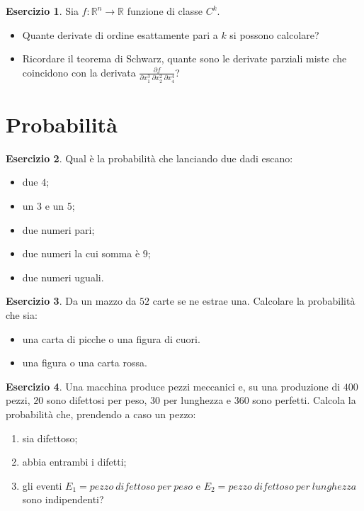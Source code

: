 \documentclass[12pt,a4paper]{article}
\theoremstyle{definition}
\newtheorem{exe}{Esercizio}
\begin{document}
\begin{exe}
	Sia $ f: \mathbb{R}^n \to \mathbb{R} $ funzione di classe $ C^k $.
	\begin{itemize}
		\item Quante derivate di ordine esattamente pari a $ k $ si possono calcolare?
		\item Ricordare il teorema di Schwarz, quante sono le derivate parziali miste che coincidono con la derivata $ \frac{\partial f}{\partial x_1^3\ \partial x_2^2\ \partial x_4^4} $?
	\end{itemize}
\end{exe}

\section{Probabilità}

\begin{exe}
	Qual è la probabilità che lanciando due dadi escano:
	\begin{itemize}
		\item due $ 4 $;
		\item un $ 3 $ e un $ 5 $;
		\item due numeri pari;
		\item due numeri la cui somma è $ 9 $;
		\item due numeri uguali.
	\end{itemize}
\end{exe}

\begin{exe}
	Da un mazzo da $ 52 $ carte se ne estrae una. Calcolare la probabilità che sia:
	\begin{itemize}
		\item una carta di picche o una figura di cuori.
		\item una figura o una carta rossa.
	\end{itemize}
\end{exe}

\begin{exe}
	Una macchina produce pezzi meccanici e, su una produzione di $ 400 $ pezzi, $ 20 $ sono difettosi per peso, $ 30 $ per lunghezza e $ 360 $ sono perfetti. Calcola la probabilità che, prendendo a caso un pezzo:
	\begin{enumerate}
		\item sia difettoso;
		\item abbia entrambi i difetti;
		\item gli eventi $ E_1 = pezzo\ difettoso\ per\ peso $ e $ E_2 = pezzo\ difettoso\ per\ lunghezza $ sono indipendenti?
	\end{enumerate}
\end{exe}
\end{document}
